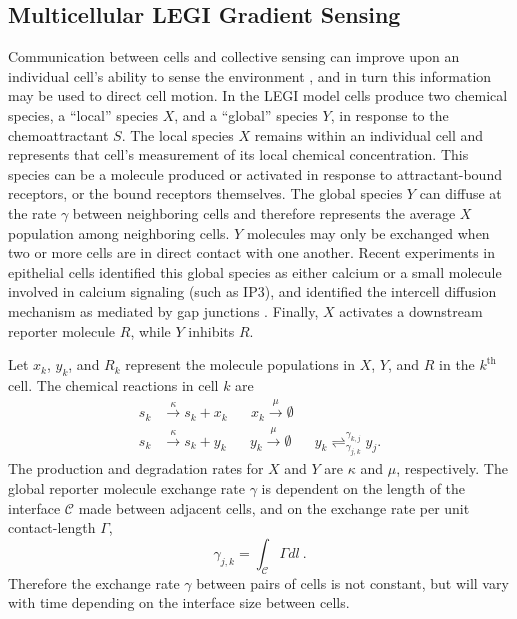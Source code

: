 \subsection{Multicellular LEGI Gradient Sensing}

Communication between cells and collective sensing can improve upon an individual cell's ability to sense the environment \cite{ellison2016cell}, and in turn this information may be used to direct cell motion.
In the LEGI model cells produce two chemical species, a ``local'' species $X$, and a ``global'' species $Y$, in response to the chemoattractant $S$. The local species $X$ remains within an individual cell and represents that cell's measurement of its local chemical concentration. This species can be a molecule produced or activated in response to attractant-bound receptors, or the bound receptors themselves. The global species $Y$ can diffuse at the rate $\gamma$ between neighboring cells and therefore represents the average $X$ population among neighboring cells. $Y$ molecules may only be exchanged when two or more cells are in direct contact with one another. Recent experiments in epithelial cells identified this global species as either calcium or a small molecule involved in calcium signaling (such as IP3), and identified the intercell diffusion mechanism as mediated by gap junctions \cite{ellison2016cell}.
Finally, $X$ activates a downstream reporter molecule $R$, while $Y$ inhibits $R$.

Let $x_k$, $y_k$, and $R_k$ represent the molecule populations in $X$, $Y$, and $R$ in the $k^\text{th}$ cell. The chemical reactions in cell $k$ are
\begin{equation}
    \begin{aligned}
        s_k &\xrightarrow{\kappa} s_k + x_k \hspace{20pt} x_k \xrightarrow{\mu} \emptyset \\
        s_k &\xrightarrow{\kappa} s_k + y_k \hspace{20pt} y_k \xrightarrow{\mu} \emptyset \hspace{20pt} y_k \rightleftharpoons_{\gamma_{j,k}}^{\gamma_{k,j}} y_{j} .
    \end{aligned}
\end{equation}
The production and degradation rates for $X$ and $Y$ are $\kappa$ and $\mu$, respectively. The global reporter molecule exchange rate $\gamma$ is dependent on the length of the interface $\mathcal{C}$ made between adjacent cells, and on the exchange rate per unit contact-length $\Gamma$,
\begin{equation}
    \gamma_{j,k} = \int_{\mathcal{C}} \Gamma dl \ .
\end{equation}
Therefore the exchange rate $\gamma$ between pairs of cells is not constant, but will vary with time depending on the interface size between cells.

